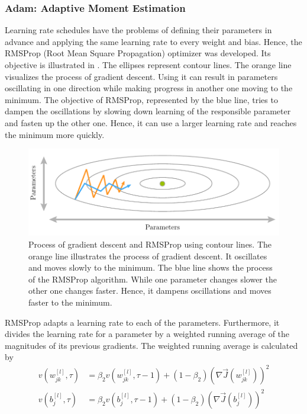 \subsubsection{Adam: Adaptive Moment Estimation}
\label{sec:training-adam}
Learning rate schedules have the problems of defining their parameters in advance and applying the same learning rate to every weight and bias.
Hence, the RMSProp (Root Mean Square Propagation) optimizer was developed\cite{Tieleman2012}.
Its objective is illustrated in .
The ellipses represent contour lines.
The orange line visualizes the process of gradient descent.
Using it can result in parameters oscillating in one direction while making progress in another one moving to the minimum.
The objective of RMSProp, represented by the blue line, tries to dampen the oscillations by slowing down learning of the responsible parameter and fasten up the other one.
Hence, it can use a larger learning rate and reaches the minimum more quickly.
\begin{figure}
	\centering
	\includegraphics[]{images/rmsprop.pdf}
	\caption[Process of gradient descent and RMSProp]{Process of gradient descent and RMSProp using contour lines. The orange line illustrates the process of gradient descent. It oscillates and moves slowly to the minimum. The blue line shows the process of the RMSProp algorithm. While one parameter changes slower the other one changes faster. Hence, it dampens oscillations and moves faster to the minimum.}
	\label{fig:rmsprop}
\end{figure}
RMSProp adapts a learning rate to each of the parameters.
Furthermore, it divides the learning rate for a parameter by a weighted running average of the magnitudes of its previous gradients.
The weighted running average is calculated by
\begin{subequations}
	\label{eq:adam-second-momentum}
	\begin{align}
		v(w^{[l]}_{jk}, \tau) &= \beta_2 v(w^{[l]}_{jk}, \tau - 1) + (1-\beta_2) (\nabla \vec{J}(w^{[l]}_{jk}))^2 \\
		v(b^{[l]}_{j}, \tau) &= \beta_2 v(b^{[l]}_{j}, \tau - 1) + (1-\beta_2) (\nabla \vec{J}(b^{[l]}_{j}))^2
	\end{align}
\end{subequations}
